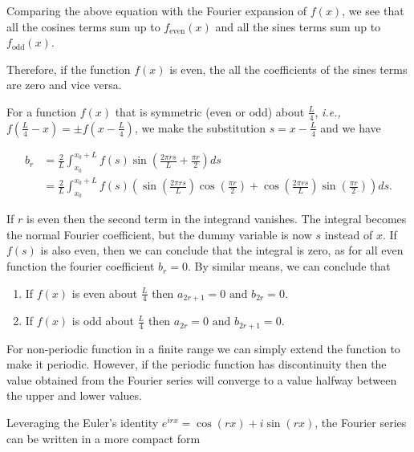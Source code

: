 \documentclass[english,a4paper,12pt]{report}
\begin{document}
Comparing the above equation with the Fourier expansion of \(f(x)\), we see that all the cosines terms sum up to \(f_{\text{even}}(x)\) and all the sines terms sum up to \(f_{\text{odd} }(x)\). 

Therefore, if the function \(f(x)\) is even, the all the coefficients of the sines terms are zero and vice versa. 

For a function \(f(x)\) that is symmetric (even or odd) about \(\frac{L}{4} \), \textit{i.e.,} \(f(\frac{L}{4}-x ) = \pm f(x - \frac{L}{4} )\), we make the substitution \(s = x-\frac{L}{4} \) and we have 

\begin{equation}
    \begin{aligned} 
    b_{r} &= \frac{2}{L} \int_{x_0 }^{x_0 + L} f(s) \sin \left( \frac{2 \pi rs}{L} + \frac{\pi r}{2} \right) ds \\ &= \frac{2}{L} \int_{x_0 }^{x_0 + L} f(s) \left( \sin \left( \frac{2 \pi  rs}{L}  \right) \cos \left( \frac{\pi r}{2}  \right) + \cos \left( \frac{2 \pi rs}{L}  \right) \sin \left( \frac{\pi r}{2} \right)\right) ds.        
    \end{aligned} 
\end{equation}

If \(r\) is even then the second term in the integrand vanishes. The integral becomes the normal Fourier coefficient, but the dummy variable is now \(s\) instead of \(x\). If \(f(s)\) is also even, then we can conclude that the integral is zero, as for all even function the fourier coefficient \(b_{r} = 0\). By similar means, we can conclude that 

\begin{enumerate}
    \item If \(f(x)\) is even about \(\frac{L}{4} \) then \(a_{2r+1} = 0 \text { and } b_{2r} = 0 \).
    \item If \(f(x)\) is odd about \(\frac{L}{4} \) then \(a_{2r} = 0 \text { and } b_{2r+1} = 0 \).      
\end{enumerate}

For non-periodic function in a finite range we can simply extend the function to make it periodic. However, if the periodic function has discontinuity then the value obtained from the Fourier series will converge to a value halfway between the upper and lower values.

Leveraging the Euler's identity \(e^{irx} = \cos (rx) + i\sin (rx) \), the Fourier series can be written in a more compact form
\end{document}
